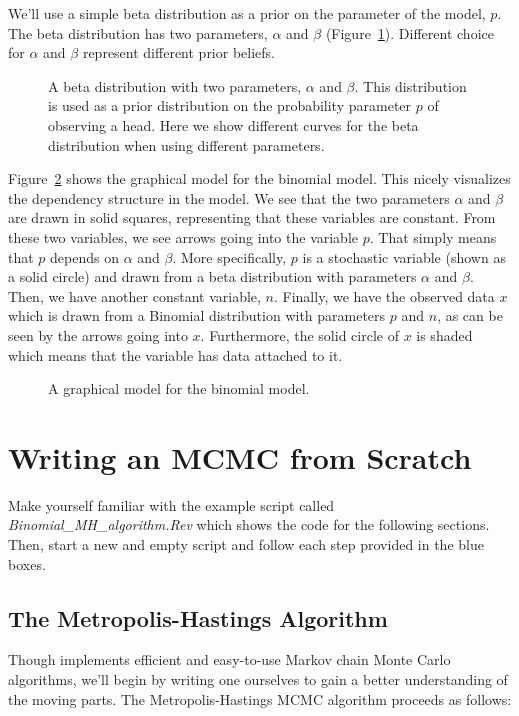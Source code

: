 We'll use a simple beta distribution as a prior on the parameter of the model, $p$.
The beta distribution has two parameters, $\alpha$ and $\beta$ (Figure~\ref{fig:beta_distribution}).
Different choice for $\alpha$ and $\beta$ represent different prior beliefs.
\begin{figure}[h!]
\centering
{}
\label{fig:beta_distribution}
\caption{A beta distribution with two parameters, $\alpha$ and $\beta$. This distribution is used as a prior distribution on the probability parameter $p$ of observing a head. Here we show different curves for the beta distribution when using different parameters.}
\end{figure}


Figure~\ref{fig:binomial_model} shows the graphical model for the binomial model.
This nicely visualizes the dependency structure in the model.
We see that the two parameters $\alpha$ and $\beta$ are drawn in solid squares, representing that these variables are constant.
From these two variables, we see arrows going into the variable $p$.
That simply means that $p$ depends on $\alpha$ and $\beta$.
More specifically, $p$ is a stochastic variable (shown as a solid circle) and drawn from a beta distribution with parameters $\alpha$ and $\beta$.
Then, we have another constant variable, $n$.
Finally, we have the observed data $x$ which is drawn from a Binomial distribution with parameters $p$ and $n$, as can be seen by the arrows going into $x$.
Furthermore, the solid circle of $x$ is shaded which means that the variable has data attached to it.
\begin{figure}[h!]
\centering
{}
\label{fig:binomial_model}
\caption{A graphical model for the binomial model.}
\end{figure}



\section{Writing an MCMC from Scratch}

\impmark Make yourself familiar with the example script called \emph{Binomial\_MH\_algorithm.Rev} which shows the code for the following sections. Then, start a new and empty script and follow each step provided in the \colorbox{shadecolor}{blue boxes}.

\subsection{The Metropolis-Hastings Algorithm}
Though \RevBayes implements efficient and easy-to-use Markov chain Monte Carlo algorithms, we'll begin by writing one ourselves to gain a better understanding of the moving parts.
The Metropolis-Hastings MCMC algorithm \citep{Metropolis1953,Hastings1970} proceeds as follows:

